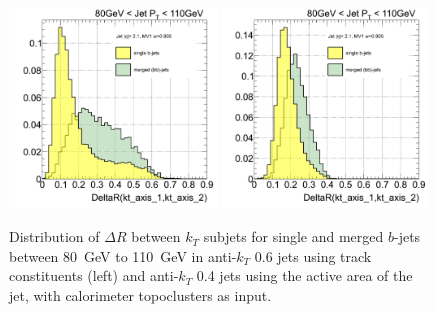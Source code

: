 \begin{figure}[tp]
\centering
\includegraphics[width=0.49\textwidth]{FIGS/TEMPFigs/Antikt6VarsSingleMerged/DRkt2axes080.pdf}
\includegraphics[width=0.49\textwidth]{FIGS/TEMPFigs/GhostMatchingVarsClus/DRkt2axes080.pdf}
\caption{Distribution of $\Delta R$ between $k_T$ subjets for single and merged $b$-jets between 80~GeV to 110~GeV in anti-$k_T$ 0.6 jets using track constituents (left) and anti-$k_T$ 0.4 jets using the active area of the jet, with calorimeter topoclusters as input.}
\label{fig:drktaxisGhostAndAntikt6}
\end{figure}

